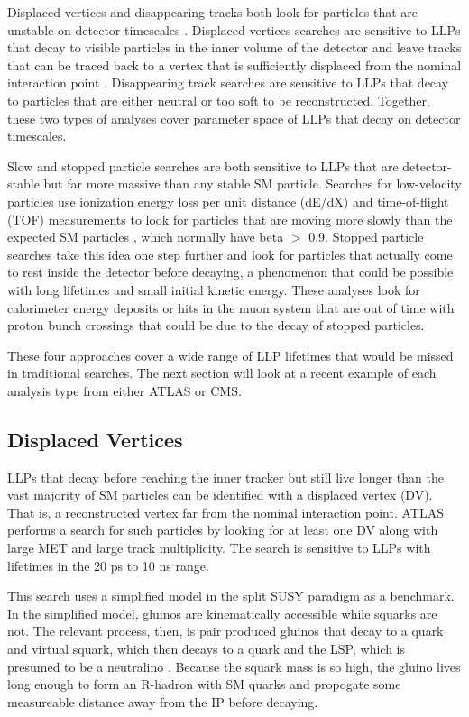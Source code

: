 \documentclass[12pt]{article}
\begin{document}
    Displaced vertices and disappearing tracks both look for particles that are unstable on detector timescales . Displaced vertices searches are sensitive to LLPs that decay to visible particles in the inner volume  of the detector and leave tracks that can be traced back to a vertex that is sufficiently displaced from the nominal interaction point . Disappearing track searches are sensitive to LLPs that decay to particles that are either neutral or too soft to be reconstructed. Together, these two types of analyses cover  parameter space of LLPs that decay on detector timescales.

    Slow and stopped particle searches are both sensitive to LLPs that are detector-stable but far more massive than any stable SM particle. Searches for low-velocity particles use ionization energy loss per unit distance (dE/dX) and time-of-flight (TOF) measurements to look for particles that are moving more slowly than the expected SM particles , which normally  have beta $>$ 0.9. Stopped particle searches take this idea one step further and look for particles that actually come to rest inside the detector before decaying, a phenomenon that could be possible with long lifetimes and small initial kinetic energy. These analyses look for calorimeter energy deposits or hits in the muon system that are out of time with proton bunch crossings that could be due to the decay of stopped particles.

    These four approaches cover a wide range of LLP lifetimes that would be missed in traditional searches. The next section will look  at a recent example of each analysis type from either ATLAS or CMS.

\subsection{Displaced Vertices}
    LLPs that decay before reaching the inner tracker but still live longer than the vast majority of SM particles can be identified with a displaced vertex (DV). That is, a reconstructed vertex far from the nominal interaction point. ATLAS performs a search for such particles by looking for at least one DV along with large MET and large track multiplicity. The search is sensitive to LLPs with lifetimes in the 20 ps to 10 ns range.

    This search uses a simplified model in the split SUSY paradigm as a benchmark. In the simplified model, gluinos are kinematically accessible while squarks are not. The relevant process, then, is pair produced gluinos that decay to a quark and virtual squark, which then decays to a quark and the LSP, which is presumed to be a neutralino . Because the squark mass is so high, the gluino lives long enough to form an R-hadron  with SM quarks and propogate some measureable distance away from the IP before decaying. 
\end{document}
